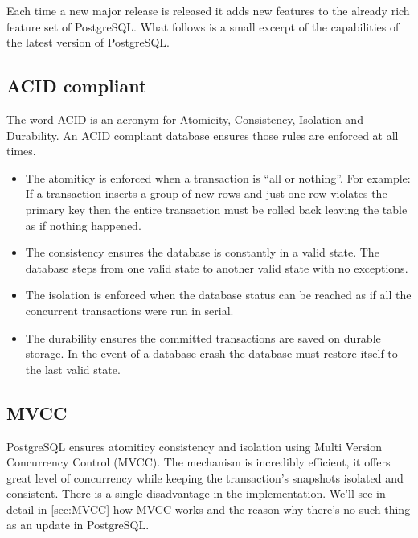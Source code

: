 Each time a new major release is released it adds new features to the already
rich feature set of PostgreSQL. What follows is a small excerpt of the
capabilities of the latest version of PostgreSQL.

\subsection{ACID compliant}

The word ACID is an acronym for Atomicity, Consistency, Isolation and
Durability. An ACID compliant database ensures those rules are enforced at all
times. \newline

\begin{itemize}

    \item The atomiticy is enforced when a transaction is ``all or nothing''. For example: If a
        transaction inserts a group of new rows and just one row violates the primary key then the entire
        transaction must be rolled back leaving the table as if nothing happened.

    \item The consistency ensures the database is constantly in a valid state. The database steps from
        one valid state to another valid state with no exceptions.

    \item The isolation is enforced when the database status can be reached as if all the concurrent
        transactions were run in serial.

    \item The durability ensures the committed transactions are saved on durable storage. In the event
        of a database crash the database must restore itself to the last valid state.

\end{itemize}

\subsection{MVCC}

PostgreSQL ensures atomiticy consistency and isolation using Multi Version
Concurrency Control (MVCC). The mechanism is incredibly efficient, it offers
great level of concurrency while keeping the transaction's snapshots isolated
and consistent. There is a single disadvantage in the implementation. We'll see
in detail in \ref{sec:MVCC} how MVCC works and the reason why there's no such
thing as an update in PostgreSQL.

